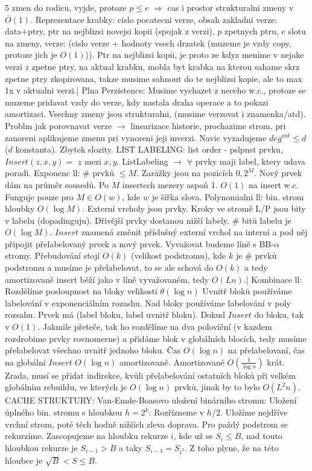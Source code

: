 \documentclass[8pt]{extarticle}
\begin{document}
\begin{multicols*}{5}
zmen do rodicu, vyjde, protoze $p\leq e$ $\Rightarrow$ cas i prostor strukturalni zmeny v $\overline{O}(1)$. Reprezentace krabky: cislo pocatecni verze, obsah zakladni verze: data+ptry, ptr na nejblizsi novejsi kopii (spojak z verzi), $p$ zpetnych ptru, $e$ slotu na zmeny, verze: (cislo verze + hodnoty vsech drzatek (muzeme je vzdy copy, protoze jich je $O(1)$)). Ptr na nejblizsi kopii, je proto ze kdyz menime v nejake verzi $z$ zpetne ptry, na aktual krabku, mobla byt krabka na kterou sahame skrz zpetne ptry zkopirovana, takze musime sahnout do te nejblizsi kopie, ale to max 1x v aktualni verzi.| Plna Perzistence: Musime vychazet z neceho w.c., protoze se muzeme pridavat vzdy do verze, kdy nastala draha operace a to pokazi amortizaci. Vsechny zmeny jsou strukturalni, (musime verzovat i znamenka/atd). Problm jak porovnavat verze $\rightarrow$ linearizace historie, prochazime strom, pri zanoreni aplikujeme zmenu pri vynoreni jeji inverzi. Navic vyzadujeme $deg^{out} \leq d$ ($d$ konstanta). Zbytek slozity. LIST LABELING: list order - pslpnst prvku, $Insert(z,x,y)=$ $z$ mezi $x,y$. ListLabeling $\rightarrow$ $\forall$ prvky maji label, ktery udava poradi. Exponenc ll: \# prvků $\leq M$. Zarážky jsou na pozicích $0, 2^M$. Nový prvek dám na průměr sousedů. Po $M$ insertech mezery aspoň 1. $O(1)$ na insert w.c. Funguje pouze pro $M \in O(w)$, kde $w$ je šířka slova. Polynomialni ll: bin. strom hloubky $O(\log M)$. Externí vrcholy jsou prvky. Kroky ve stromě L/P jsou bity v labelu (dopadinguju). Dřivější prvky dostanou nižší labely. \# bitů labelu je $O(\log M)$. $Insert$ znamená změnit příslušný externí vrchol na interní a pod něj připojit přelabelovaný prvek a nový prvek. Vyvažovat budeme líně s BB-$\alpha$ stromy. Přebudování stojí $O(k)$ (velikost podstromu), kde $k$ je \# prvků podstromu a musíme je přelabelovat, to se ale schová do $O(k)$ a tedy amortizovaně insert běží jako v líně vyvažovaném, tedy $O(Ln)$.| Kombinace ll: Rozdělíme posloupnost na bloky velikosti $\theta(\log n)$ Uvnitř bloků používáme labelování v exponenciálním rozashu. Nad bloky používáme labelování v poly rozsahu. Prvek má (label bloku, label uvnitř bloku). Dokud $Insert$ do bloku, tak v $O(1)$. Jakmile přeteče, tak ho rozdělíme na dva poloviční (v kazdem rozdrobime prvky rovnomerne) a přidáme blok v globálních blocích, tedy musíme přelabelovat všechno uvnitř jednoho bloku. Čas $O(\log n)$ na přelabelovaní, čas na globální $Insert$ $O(\log n)$ amortizovaně. Amortizovaně $O(\frac{1}{\log n})$ krát. Zrada, musí se přidat indirekce, kvůli přelabelování ostatních bloků při velkém globálním rebuildu, ve kterých je $O(\log n)$ prvků, jinak by to bylo $O(L^2n)$. CACHE STRUKTURY: Van-Emde-Boasovo uložení binárního stromu: Uložení úplného bin. stromu s hloubkou $h=2^k$: Rozřízneme v $h/2$. Uložíme nejdříve vrchní strom, poté těch hodně nižších zleva doprava. Pro paždý podstrom se rekurzíme. Zascopujeme na hloubku rekurze $i$, kde už se $S_i \leq B$, nad touto hloubkou rekurze je $S_{i-1} > B$ a taky $S_{i-1} = S_{i^2}$. Z toho plyne, že na této hloubce je $\sqrt{B} < S \le B$.

\end{multicols*}
\end{document}
